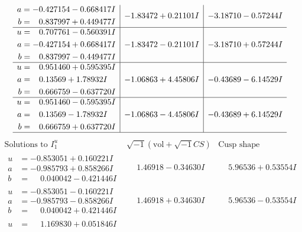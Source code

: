 \documentclass[1p]{elsarticle_modified}
\theoremstyle{definition}
\newcommand{\I}{\sqrt{-1}}
\begin{document}
$$\begin{array}{c|c|c}
\begin{aligned}
a &= -0.427154 - 0.668417 I \\
b &= \phantom{-}0.837997 + 0.449477 I\end{aligned}
 & -1.83472 + 0.21101 I & -3.18710 - 0.57244 I \\ \hline\begin{aligned}
u &= \phantom{-}0.707761 - 0.560391 I \\
a &= -0.427154 + 0.668417 I \\
b &= \phantom{-}0.837997 - 0.449477 I\end{aligned}
 & -1.83472 - 0.21101 I & -3.18710 + 0.57244 I \\ \hline\begin{aligned}
u &= \phantom{-}0.951460 + 0.595395 I \\
a &= \phantom{-}0.13569 + 1.78932 I \\
b &= \phantom{-}0.666759 - 0.637720 I\end{aligned}
 & -1.06863 + 4.45806 I & -0.43689 - 6.14529 I \\ \hline\begin{aligned}
u &= \phantom{-}0.951460 - 0.595395 I \\
a &= \phantom{-}0.13569 - 1.78932 I \\
b &= \phantom{-}0.666759 + 0.637720 I\end{aligned}
 & -1.06863 - 4.45806 I & -0.43689 + 6.14529 I\\
 \hline 
 \end{array}$$\newpage$$\begin{array}{c|c|c}  
\text{Solutions to }I^u_{1}& \I (\text{vol} + \sqrt{-1}CS) & \text{Cusp shape}\\
 \hline 
\begin{aligned}
u &= -0.853051 + 0.160221 I \\
a &= -0.985793 + 0.858266 I \\
b &= \phantom{-}0.040042 - 0.421446 I\end{aligned}
 & \phantom{-}1.46918 - 0.34630 I & \phantom{-}5.96536 + 0.53554 I \\ \hline\begin{aligned}
u &= -0.853051 - 0.160221 I \\
a &= -0.985793 - 0.858266 I \\
b &= \phantom{-}0.040042 + 0.421446 I\end{aligned}
 & \phantom{-}1.46918 + 0.34630 I & \phantom{-}5.96536 - 0.53554 I \\ \hline\begin{aligned}
u &= \phantom{-}1.169830 + 0.051846 I \\

\end{aligned}
\end{array}$$
\end{document}
